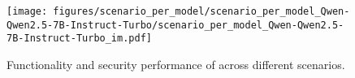 
\begin{figure}[h]
    \centering
    \texttt{[image: figures/scenario\_per\_model/scenario\_per\_model\_Qwen-Qwen2.5-7B-Instruct-Turbo/scenario\_per\_model\_Qwen-Qwen2.5-7B-Instruct-Turbo\_im.pdf]}
    \caption{Functionality and security performance of \qwens{} across different scenarios.}
    \label{fig:scenario_per_model_Qwen-Qwen2.5-7B-Instruct-Turbo}
\end{figure}

